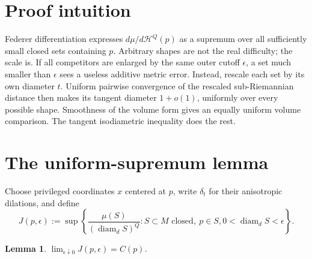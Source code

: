 \documentclass[11pt]{article}
\newtheorem{lemma}{Lemma}
\newcommand{\Hh}{\mathcal H}
\newcommand{\diam}{\operatorname{diam}}
\begin{document}
\section{Proof intuition}

Federer differentiation expresses $d\mu/d\Hh^Q(p)$ as a supremum over all
sufficiently small closed sets containing $p$.  Arbitrary shapes are not the
real difficulty; the scale is.  If all competitors are enlarged by the same
outer cutoff $\epsilon$, a set much smaller than $\epsilon$ sees a useless
additive metric error.  Instead, rescale each set by its own diameter $t$.
Uniform pairwise convergence of the rescaled sub-Riemannian distance then
makes its tangent diameter $1+o(1)$, uniformly over every possible shape.
Smoothness of the volume form gives an equally uniform volume comparison.
The tangent isodiametric inequality does the rest.

\section{The uniform-supremum lemma}

Choose privileged coordinates $x$ centered at $p$, write $\delta_t$ for
their anisotropic dilations, and define
\begin{equation}\label{eq:J}
 J(p,\epsilon):=\sup\left\{
 \frac{\mu(S)}{(\diam_d S)^Q}: S\subset M\text{ closed},\ p\in S,
 0<\diam_d S<\epsilon\right\}.
\end{equation}

\begin{lemma}\label{lem:blowup}
$\displaystyle\lim_{\epsilon\downarrow0}J(p,\epsilon)=C(p)$.
\end{lemma}
\end{document}
